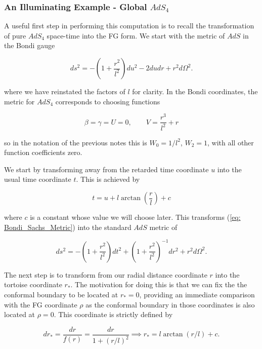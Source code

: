 \documentclass[a4paper,11pt]{article}
\numberwithin{equation}{section}
\begin{document}
\subsubsection{An Illuminating Example - Global $AdS_4$}

A useful first step in performing this computation is to recall the transformation of pure $AdS_{4}$ space-time into the FG form. We start with the metric of $AdS$ in the Bondi gauge 

\begin{equation}
ds^2=-\left(1+\frac{r^2}{l^2}\right)du^2-2dudr+r^2d\Omega^2.
\end{equation}

\noindent where we have reinstated the factors of $l$ for clarity. In the Bondi coordinates, the metric for $AdS_4$ corresponds to choosing functions 

\begin{equation}
\beta=\gamma=U=0, \qquad V=\frac{r^3}{l^2}+r
\end{equation}

\noindent so in the notation of the previous notes this is $W_{0}=1/l^2$, $W_{2}=1$, with all other function coefficients zero. \par

We start by transforming away from the retarded time coordinate $u$ into the usual time coordinate $t$. This is achieved by 

\begin{equation} \label{eq: time_transformation}
t=u+l\arctan\left(\frac{r}{l}\right)+c  
\end{equation}

\noindent where $c$ is a constant whose value we will choose later. This transforms (\ref{eq: Bondi_Sachs_Metric}) into the standard $AdS$ metric of 

\begin{equation} \label{eq: AdS_metric}
ds^2=-\left(1+\frac{r^2}{l^2}\right)dt^2+\left(1+\frac{r^2}{l^2}\right)^{-1}dr^2+r^2d\Omega^2.
\end{equation}

The next step is to transform from our radial distance coordinate $r$ into the tortoise coordinate $r_*$. The motivation for doing this is that we can fix the the conformal boundary to be located at $r_*=0$, providing an immediate comparison with the FG coordinate $\rho$ as the conformal boundary in those coordinates is also located at $\rho=0$. This coordinate is strictly defined by 

\begin{equation} \label{eq: tortoise_def}
dr_{*}=\frac{dr}{f(r)}=\frac{dr}{1+(r/l)^2} \implies r_{*}=l\arctan(r/l)+c.
\end{equation}
\end{document}
